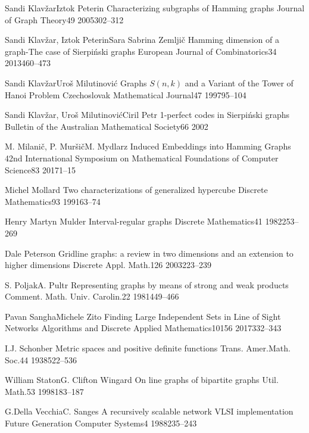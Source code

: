 \documentclass[12pt,a4paper,titlepage,openany]{report}
\begin{document}
\begin{thebibliography}{99}
  \articleInJournalManyAuthors
    {Sandi Klav\v zar}{Iztok Peterin}
    {Characterizing subgraphs of Hamming graphs}
   {Journal of Graph Theory}{49}
   {2005}{302--312} 

  \articleInJournalManyAuthors
    {Sandi Klav\v zar, Iztok Peterin}{Sara Sabrina Zemlji\v c}
    {Hamming dimension of a graph-The case of Sierpi\'nski graphs}
   {European Journal of Combinatorics}{34}
   {2013}{460--473}

  \articleInJournalManyAuthors
    {Sandi Klav\v zar}{Uro\v s Milutinovi\' c}
    {Graphs $S(n, k)$ and a Variant of the Tower of Hanoi Problem}
   {Czechoslovak Mathematical Journal}{47}
   {1997}{95--104}

  \articleInJournalManyAuthors
    {Sandi Klav\v zar, Uro\v s Milutinovi\' c}{Ciril Petr}
    {1-perfect codes in Sierpi\' nski graphs}
   {Bulletin of the Australian Mathematical Society}{66}
   {2002}{}


  \articleInJournalManyAuthors
    {M. Milani\v c, P. Mur\v si\v c}{M. Mydlarz}
    {Induced Embeddings into Hamming Graphs}
   {42nd International Symposium on Mathematical Foundations of Computer Science}{83}
   {2017}{1--15}   

  \articleInJournalOneAuthor
    {Michel Mollard}
    {Two characterizations of generalized hypercube}
   {Discrete Mathematics}{93}
   {1991}{63--74}

  \articleInJournalOneAuthor
    {Henry Martyn Mulder}
    {Interval-regular graphs}
   {Discrete Mathematics}{41}
   {1982}{253--269}  

\articleInJournalOneAuthor
    {Dale Peterson}
    {Gridline graphs: a review in two dimensions and an extension to higher dimensions}
   {Discrete Appl. Math.}{126}
   {2003}{223--239}


  \articleInJournalManyAuthors
    {S. Poljak}{A. Pultr}
    {Representing graphs by means of strong and weak products}
   {Comment. Math. Univ. Carolin.}{22}
   {1981}{449--466} 


  \articleInJournalManyAuthors
    {Pavan Sangha}{Michele Zito}
    {Finding Large Independent Sets in Line of Sight Networks}
   {Algorithms and Discrete Applied Mathematics}{10156}
   {2017}{332--343}    

\articleInJournalOneAuthor
    {I.J. Schonber}
    {Metric spaces and positive definite functions}
   {Trans. Amer.Math. Soc.}{44}
   {1938}{522--536}


  \articleInJournalManyAuthors
    {William Staton}{G. Clifton Wingard}
    {On line graphs of bipartite graphs}
   {Util. Math.}{53}
   {1998}{183--187}      
   
  \articleInJournalManyAuthors
    {G.Della Vecchia}{C. Sanges}
    {A recursively scalable network VLSI implementation}
   {Future Generation Computer Systems}{4}
   {1988}{235--243}    
        
\end{thebibliography}
\end{document}
